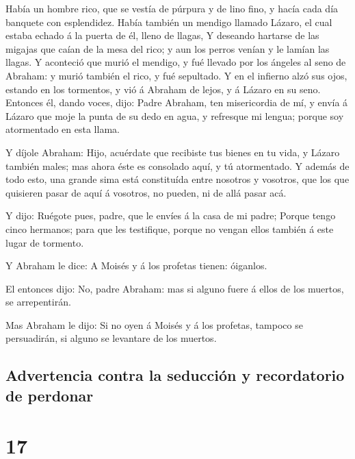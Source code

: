  Había un hombre rico, que se vestía de púrpura y de lino
fino, y hacía cada día banquete con esplendidez.  Había
también un mendigo llamado Lázaro, el cual estaba echado á la puerta de
él, lleno de llagas,  Y deseando hartarse de las migajas
que caían de la mesa del rico; y aun los perros venían y le lamían las
llagas.  Y aconteció que murió el mendigo, y fué llevado
por los ángeles al seno de Abraham: y murió también el rico, y fué
sepultado.  Y en el infierno alzó sus ojos, estando en
los tormentos, y vió á Abraham de lejos, y á Lázaro en su seno.
 Entonces él, dando voces, dijo: Padre Abraham, ten
misericordia de mí, y envía á Lázaro que moje la punta de su dedo en
agua, y refresque mi lengua; porque soy atormentado en esta llama.

 Y díjole Abraham: Hijo, acuérdate que recibiste tus
bienes en tu vida, y Lázaro también males; mas ahora éste es consolado
aquí, y tú atormentado.  Y además de todo esto, una
grande sima está constituída entre nosotros y vosotros, que los que
quisieren pasar de aquí á vosotros, no pueden, ni de allá pasar acá.

 Y dijo: Ruégote pues, padre, que le envíes á la casa de
mi padre;  Porque tengo cinco hermanos; para que les
testifique, porque no vengan ellos también á este lugar de tormento.

 Y Abraham le dice: A Moisés y á los profetas tienen:
óiganlos.

 El entonces dijo: No, padre Abraham: mas si alguno fuere
á ellos de los muertos, se arrepentirán.

 Mas Abraham le dijo: Si no oyen á Moisés y á los
profetas, tampoco se persuadirán, si alguno se levantare de los muertos.

\hypertarget{advertencia-contra-la-seducciuxf3n-y-recordatorio-de-perdonar}{%
\subsection{Advertencia contra la seducción y recordatorio de
perdonar}\label{advertencia-contra-la-seducciuxf3n-y-recordatorio-de-perdonar}}

\hypertarget{section-16}{%
\section{17}\label{section-16}}

